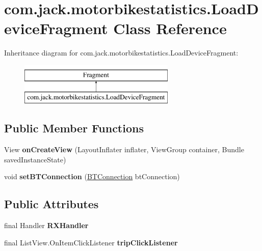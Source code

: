 \hypertarget{classcom_1_1jack_1_1motorbikestatistics_1_1_load_device_fragment}{}\section{com.\+jack.\+motorbikestatistics.\+Load\+Device\+Fragment Class Reference}
\label{classcom_1_1jack_1_1motorbikestatistics_1_1_load_device_fragment}
Inheritance diagram for com.\+jack.\+motorbikestatistics.\+Load\+Device\+Fragment\+:\begin{figure}[H]
\begin{center}
\leavevmode
\includegraphics[height=2.000000cm]{classcom_1_1jack_1_1motorbikestatistics_1_1_load_device_fragment}
\end{center}
\end{figure}
\subsection*{Public Member Functions}
\begin{DoxyCompactItemize}
\item 
\mbox{\label{classcom_1_1jack_1_1motorbikestatistics_1_1_load_device_fragment_a9ad9f0d9ef69417e2131613009c02338}} 
View {\bfseries on\+Create\+View} (Layout\+Inflater inflater, View\+Group container, Bundle saved\+Instance\+State)
\item 
\mbox{\label{classcom_1_1jack_1_1motorbikestatistics_1_1_load_device_fragment_aec66dc5fd944098de78ace4175fca5b6}} 
void {\bfseries set\+B\+T\+Connection} (\hyperlink{classcom_1_1jack_1_1motorbikestatistics_1_1_b_t_connection}{B\+T\+Connection} bt\+Connection)
\end{DoxyCompactItemize}
\subsection*{Public Attributes}
\begin{DoxyCompactItemize}
\item 
final Handler {\bfseries R\+X\+Handler}
\item 
final List\+View.\+On\+Item\+Click\+Listener {\bfseries trip\+Click\+Listener}
\end{DoxyCompactItemize}
